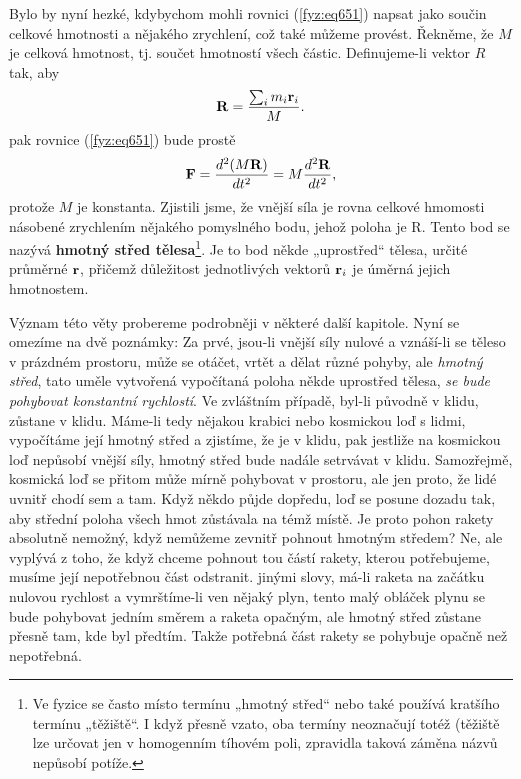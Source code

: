     Bylo by nyní hezké, kdybychom mohli rovnici (\ref {fyz:eq651}) napsat jako součin celkové
    hmotnosti a nějakého zrychlení, což také můžeme provést. Řekněme, že \(M\) je celková hmotnost,
    tj. součet hmotností všech částic. Deﬁnujeme-li vektor \(R\) tak, aby
    \begin{equation}\label{fyz:eq652}
      \mathbf{R}=\frac{\sum_im_i\mathbf{r}_i}{M}.
    \end{equation}
    pak rovnice (\ref {fyz:eq651}) bude prostě
    \begin{equation}\label{fyz:eq653}
      \mathbf{F}=\dfrac{d^2 (M\mathbf{R})}{d t^2}=M\dfrac{d^2 \mathbf{R}}{d t^2},
    \end{equation}
    protože \(M\) je konstanta. Zjistili jsme, že vnější síla je rovna celkové hmomosti násobené
    zrychlením nějakého pomyslného bodu, jehož poloha je R. Tento bod se nazývá \textbf{hmotný střed
    tělesa}\footnote{Ve fyzice se často místo termínu „hmotný střed“ nebo také 
    používá kratšího termínu „těžiště“. I když přesně vzato, oba termíny neoznačují totéž (těžiště
    lze určovat jen v homogenním tíhovém poli, zpravidla taková záměna názvů nepůsobí potíže. }. Je
    to bod někde „uprostřed“ tělesa, určité průměrné \(\mathbf{r}\), přičemž důležitost jednotlivých
    vektorů \(\mathbf{r}_i\) je úměrná jejich hmotnostem. 

    Význam této věty probereme podrobněji v některé další kapitole. Nyní se omezíme na dvě poznámky:
    Za prvé, jsou-li vnější síly nulové a vznáší-li se těleso v prázdném prostoru, může se otáčet,
    vrtět a dělat různé pohyby, ale \emph{hmotný střed}, tato uměle vytvořená vypočítaná poloha
    někde uprostřed tělesa, \emph{se bude pohybovat konstantní rychlostí}. Ve zvláštním případě,
    byl-li původně v klidu, zůstane v klidu. Máme-li tedy nějakou krabici nebo kosmickou loď s
    lidmi, vypočítáme její hmotný střed a zjistíme, že je v klidu, pak jestliže na kosmickou loď
    nepůsobí vnější síly, hmotný střed bude nadále setrvávat v klidu. Samozřejmě, kosmická loď se
    přitom může mírně pohybovat v prostoru, ale jen proto, že lidé uvnitř chodí sem a tam. Když
    někdo půjde dopředu, loď se posune dozadu tak, aby střední poloha všech hmot zůstávala na témž
    místě. Je proto pohon rakety absolutně nemožný, když nemůžeme zevnitř pohnout hmotným středem?
    Ne, ale vyplývá z toho, že když chceme pohnout tou částí rakety, kterou potřebujeme, musíme její
    nepotřebnou část odstranit. jinými slovy, má-li raketa na začátku nulovou rychlost a
    vymrštíme-li ven nějaký plyn, tento malý obláček plynu se bude pohybovat jedním směrem a raketa
    opačným, ale hmotný střed zůstane přesně tam, kde byl předtím. Takže potřebná část rakety se
    pohybuje opačně než nepotřebná.

